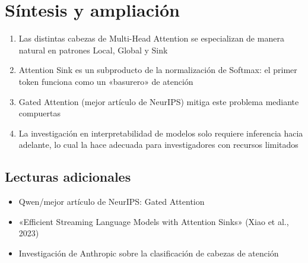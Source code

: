 \section{Síntesis y ampliación}

\begin{enumerate}
  \item Las distintas cabezas de Multi-Head Attention se especializan de manera natural en patrones Local, Global y Sink
  \item Attention Sink es un subproducto de la normalización de Softmax: el primer token funciona como un «basurero» de atención
  \item Gated Attention (mejor artículo de NeurIPS) mitiga este problema mediante compuertas
  \item La investigación en interpretabilidad de modelos solo requiere inferencia hacia adelante, lo cual la hace adecuada para investigadores con recursos limitados
\end{enumerate}

\subsection{Lecturas adicionales}
\begin{itemize}
  \item Qwen/mejor artículo de NeurIPS: Gated Attention
  \item «Efficient Streaming Language Models with Attention Sinks» (Xiao et al., 2023)
  \item Investigación de Anthropic sobre la clasificación de cabezas de atención
\end{itemize}


